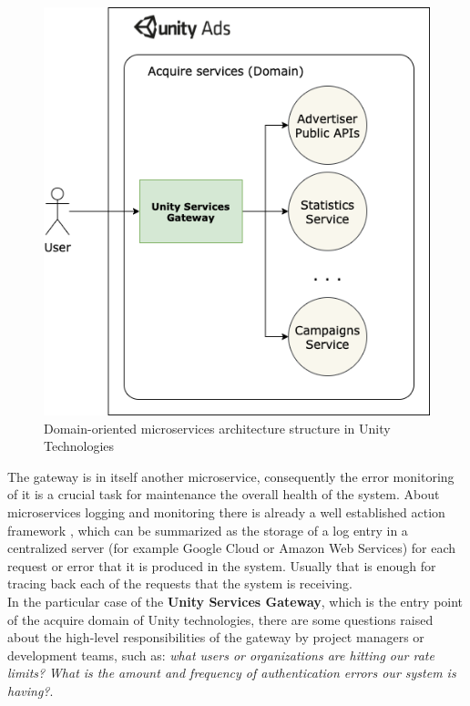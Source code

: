 \documentclass[english, 12pt, a4paper, sci, utf8, a-1b, online]{aaltothesis}
\begin{document}
\begin{figure}[h]
    \centering
    \includegraphics[scale=0.3]{src/proposal/img/unity-services-diagram.png}
    \caption{Domain-oriented microservices architecture structure in Unity Technologies}
    \label{fig:unity-acquire-domain}
\end{figure}

The gateway is in itself another microservice, consequently the error monitoring of it is a crucial task for maintenance the overall health of the system. About microservices logging and monitoring there is already a well established action framework \cite{MicroservicesBestPractices}, which can be summarized as the storage of a log entry in a centralized server (for example Google Cloud or Amazon Web Services) for each request or error that it is produced in the system. Usually that is enough for tracing back each of the requests that the system is receiving.\\

In the particular case of the \textbf{Unity Services Gateway}, which is the entry point of the acquire domain of Unity technologies, there are some questions raised about the high-level responsibilities of the gateway by project managers or development teams, such as: \textit{what users or organizations are hitting our rate limits?} \textit{What is the amount and frequency of authentication errors our system is having?}.\\
\end{document}
